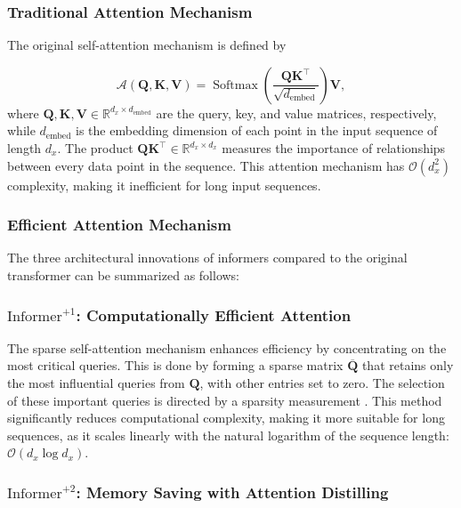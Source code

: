 \documentclass{ieeetmlcn}
\begin{document}
\subsubsection*{Traditional Attention Mechanism}

The original self-attention mechanism \cite{vaswani2017attention} is defined by

\begin{equation}
\mathcal{A}(\mathbf{Q}, \mathbf{K}, \mathbf{V}) = \operatorname{Softmax}\left(\frac{\mathbf{QK}^\top}{\sqrt{d_{\text{embed}}}}\right) \mathbf{V},
\end{equation}
where $\mathbf{Q}, \mathbf{K}, \mathbf{V} \in \mathbb{R}^{d_x \times d_{\text{embed}}}$ are the query, key, and value matrices, respectively, while $d_{\text{embed}}$ is the embedding dimension of each point in the input sequence of length $d_x$. The product $\mathbf{QK}^\top \in \mathbb{R}^{d_x \times d_x}$ measures the importance of relationships between every data point in the sequence. This attention mechanism has $\mathcal{O}(d_x^2)$ complexity, making it inefficient for long input sequences.


\subsubsection*{Efficient Attention Mechanism}

The three architectural innovations of informers compared to the original transformer can be summarized as follows:
\subsubsection*{$\text{Informer}^{+1}$: Computationally Efficient Attention}

The sparse self-attention mechanism enhances efficiency by concentrating on the most critical queries. This is done by forming a sparse matrix $\overline{\mathbf{Q}}$ that retains only the most influential queries from $\mathbf{Q}$, with other entries set to zero. The selection of these important queries is directed by a sparsity measurement \cite{zhou2021informer}. This method significantly reduces computational complexity, making it more suitable for long sequences, as it scales linearly with the natural logarithm of the sequence length: $\mathcal{O}(d_x \log d_x)$.

\subsubsection*{$\text{Informer}^{+2}$: Memory Saving with Attention Distilling}
\end{document}
